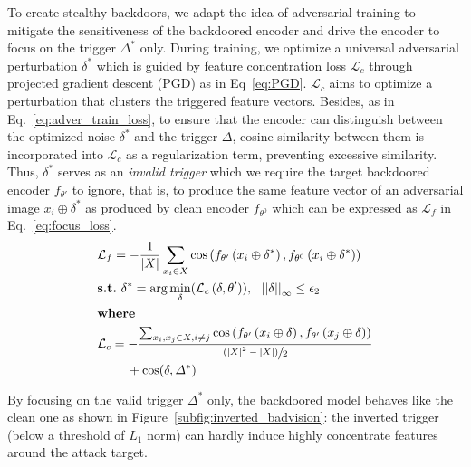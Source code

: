 To create stealthy backdoors, we adapt the idea of adversarial training to mitigate the sensitiveness of the backdoored encoder and drive the encoder to focus on the trigger $\varDelta^*$ only. During training, we optimize a universal adversarial perturbation $\delta^*$ which is guided by feature concentration loss $\mathcal{L}_{c}$ through projected gradient descent (PGD) as in Eq~\ref{eq:PGD}. $\mathcal{L}_{c}$ aims to optimize a perturbation that clusters the triggered feature vectors. Besides, as in Eq.~\ref{eq:adver_train_loss}, to ensure that the encoder can distinguish between the optimized noise $\delta^*$ and the trigger $\varDelta$,
cosine similarity between them is incorporated into $\mathcal{L}_{c}$ as a regularization term, preventing excessive similarity. Thus, $\delta^*$ serves as an \emph{invalid trigger} which we require the target backdoored encoder $f_{\theta'}$ to ignore, that is, to produce the same feature vector of an adversarial image $x_i \oplus \delta^*$ as produced by clean encoder $f_{\theta^0}$ which can be expressed as $\mathcal{L}_{f}$ in Eq.~\ref{eq:focus_loss}. 
\begin{align}
    &\mathcal{L}_{f}= -\frac{1}{\left| X \right|} \sum_{x_i \in X} \cos\left( f_{\theta'}\left( x_i \oplus \delta^* \right), f_{\theta^0}\left( x_i \oplus \delta^*  \right) \right) \label{eq:focus_loss}\\
    &\text{\textbf{s.t.}}~\delta^* =\arg \min_{\delta}(\mathcal{L}_{c}\left( \delta, \theta' \right)), ~~\left|\left|\delta\right|\right|_\infty \leq \epsilon_2 \label{eq:PGD} \\ 
    &\text{\textbf{where}} \notag \\ 
    &\mathcal{L}_{c}=-\frac{\sum_{x_i,x_j \in X, i \neq j} \cos\left( f_{\theta'}\left( x_i \oplus \delta  \right), f_{\theta'}\left( x_j \oplus \delta  \right) \right)}{\sfrac{(\left| X \right|^2 - \left| X \right|)}{2}} \notag \\
    &\quad\quad~ + \cos(\delta, \varDelta^*) \label{eq:adver_train_loss}
\end{align}

By focusing on the valid trigger $\varDelta^*$ only, the backdoored model behaves like the clean one as shown in Figure~\ref{subfig:inverted_badvision}: the inverted trigger (below a threshold of $L_1$ norm) can hardly induce highly concentrate features around the attack target. 

